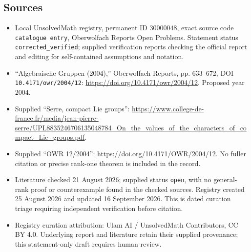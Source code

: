 \documentclass[11pt]{article}
\begin{document}
\subsection{Sources}
\begin{itemize}
\item Local UnsolvedMath registry, permanent ID \(30000048\), exact source code \texttt{catalogue entry}, Oberwolfach Reports Open Problems. Statement status \texttt{corrected\_verified}; supplied verification reports checking the official report and editing for self-contained assumptions and notation.
\item ``Algebraische Gruppen (2004),'' Oberwolfach Reports, pp. 633--672, DOI \texttt{10.4171/owr/2004/12}: \url{https://doi.org/10.4171/owr/2004/12}. Proposed year 2004.
\item Supplied ``Serre, compact Lie groups'': \url{https://www.college-de-france.fr/media/jean-pierre-serre/UPL8835246706135048784_On_the_values_of_the_characters_of_compact_Lie_groups.pdf}.
\item Supplied ``OWR 12/2004'': \url{https://doi.org/10.4171/OWR/2004/12}. No fuller citation or precise rank-one theorem is included in the record.
\item Literature checked 21 August 2026; supplied status \texttt{open}, with no general-rank proof or counterexample found in the checked sources. Registry created 25 August 2026 and updated 16 September 2026. This is dated curation triage requiring independent verification before citation.
\item Registry curation attribution: Ulam AI / UnsolvedMath Contributors, CC BY 4.0. Underlying report and literature retain their supplied provenance; this statement-only draft requires human review.
\end{itemize}
\end{document}
